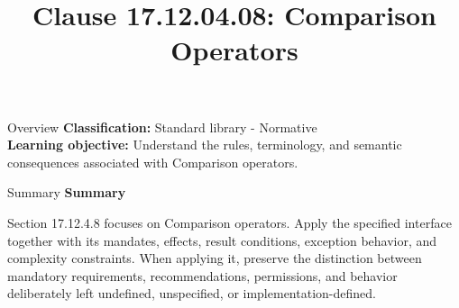 \documentclass[10pt,letterpaper]{article}
\title{Clause 17.12.04.08: Comparison Operators}
\author{}
\date{}
\begin{document}
\maketitle
\begin{CornellOverviewBox}{Overview}
\textbf{Classification:} Standard library - Normative\\[2pt]
\textbf{Learning objective:} Understand the rules, terminology, and semantic consequences associated with Comparison operators.
\end{CornellOverviewBox}\begin{CornellSummaryBox}{Summary}
{\sffamily\bfseries\color{Accent} Summary}\par\vspace{3pt}Section 17.12.4.8 focuses on Comparison operators. Apply the specified interface together with its mandates, effects, result conditions, exception behavior, and complexity constraints. When applying it, preserve the distinction between mandatory requirements, recommendations, permissions, and behavior deliberately left undefined, unspecified, or implementation-defined.
\end{CornellSummaryBox}
\end{document}
